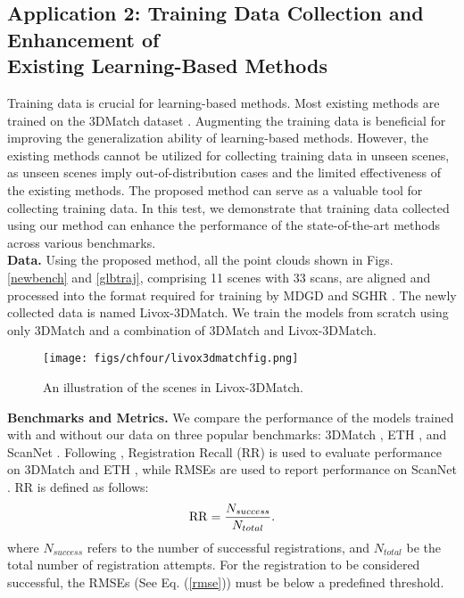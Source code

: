 \subsection{Application 2: Training Data Collection and Enhancement of\\ Existing Learning-Based Methods} \label{testadd}
Training data is crucial for learning-based methods. Most existing methods \cite{sghr,mdgd} are trained on the 3DMatch dataset \cite{3dmatch}. Augmenting the training data is beneficial for improving the generalization ability of learning-based methods. However, the existing methods cannot be utilized for collecting training data in unseen scenes, as unseen scenes imply out-of-distribution cases and the limited effectiveness of the existing methods.
The proposed method can serve as a valuable tool for collecting training data. 
In this test, we demonstrate that training data collected using our method can enhance the performance of the state-of-the-art methods across various benchmarks.\\
\noindent\textbf{Data.} Using the proposed method, all the point clouds shown in Figs. \ref{newbench} and \ref{glbtraj}, comprising 11 scenes with 33 scans, are aligned and processed into the format required for training by MDGD \cite{mdgd} and SGHR \cite{sghr}. The newly collected data is named Livox-3DMatch. We train the models \cite{mdgd,sghr} from scratch using only 3DMatch and a combination of 3DMatch and Livox-3DMatch.
\begin{figure}[H] 
	\centering
\texttt{[image: figs/chfour/livox3dmatchfig.png]}
	\caption{An illustration of the scenes in Livox-3DMatch.}
	\label{livox3dmatchfig}
\end{figure}
\noindent\textbf{Benchmarks and Metrics.}
We compare the performance of the models \cite{mdgd,sghr} trained with and without our data on three popular benchmarks: 3DMatch \cite{3dmatch}, ETH \cite{eth}, and ScanNet \cite{scan}. Following \cite{sghr}, Registration Recall (RR) is used to evaluate performance on 3DMatch \cite{3dmatch} and ETH \cite{eth}, while RMSEs are used to report performance on ScanNet \cite{scan}. RR is defined as follows:
\begin{equation}
{\rm RR} =\frac{N_{success}}{N_{total}}.
\end{equation}
where $N_{success}$ refers to the number of successful registrations, and $N_{total}$ be the total number of registration attempts. For the registration to be considered successful, the RMSEs (See Eq. (\ref{rmse})) must be below a predefined threshold.\par
